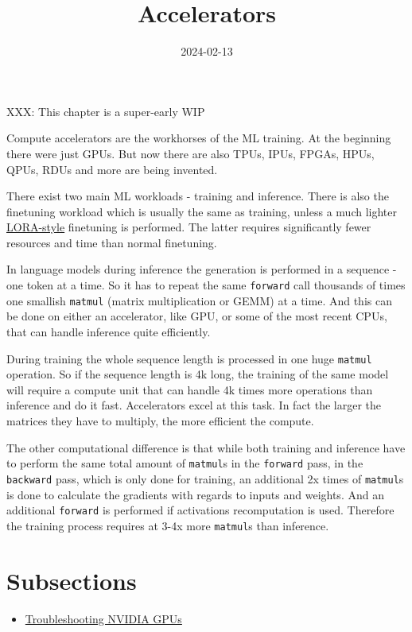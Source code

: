 \documentclass[
]{report}
\title{Accelerators}
\author{}
\date{2024-02-13}
\providecommand{\tightlist}{%
  \setlength{\itemsep}{0pt}\setlength{\parskip}{0pt}}\usepackage{longtable,booktabs,array}
\begin{document}
\maketitle

XXX: This chapter is a super-early WIP

Compute accelerators are the workhorses of the ML training. At the
beginning there were just GPUs. But now there are also TPUs, IPUs,
FPGAs, HPUs, QPUs, RDUs and more are being invented.

There exist two main ML workloads - training and inference. There is
also the finetuning workload which is usually the same as training,
unless a much lighter
\href{https://arxiv.org/abs/2106.09685}{LORA-style} finetuning is
performed. The latter requires significantly fewer resources and time
than normal finetuning.

In language models during inference the generation is performed in a
sequence - one token at a time. So it has to repeat the same
\texttt{forward} call thousands of times one smallish \texttt{matmul}
(matrix multiplication or GEMM) at a time. And this can be done on
either an accelerator, like GPU, or some of the most recent CPUs, that
can handle inference quite efficiently.

During training the whole sequence length is processed in one huge
\texttt{matmul} operation. So if the sequence length is 4k long, the
training of the same model will require a compute unit that can handle
4k times more operations than inference and do it fast. Accelerators
excel at this task. In fact the larger the matrices they have to
multiply, the more efficient the compute.

The other computational difference is that while both training and
inference have to perform the same total amount of \texttt{matmul}s in
the \texttt{forward} pass, in the \texttt{backward} pass, which is only
done for training, an additional 2x times of \texttt{matmul}s is done to
calculate the gradients with regards to inputs and weights. And an
additional \texttt{forward} is performed if activations recomputation is
used. Therefore the training process requires at 3-4x more
\texttt{matmul}s than inference.

\section{Subsections}\label{subsections}

\begin{itemize}
\tightlist
\item
  \href{nvidia/debug.md}{Troubleshooting NVIDIA GPUs}
\end{itemize}
\end{document}

